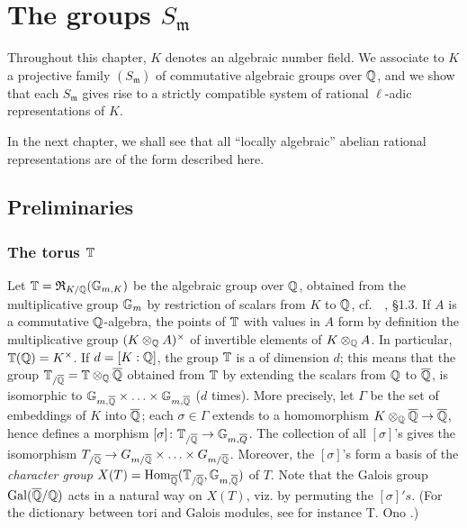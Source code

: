 \chapter{The groups \texorpdfstring{$S_{\mathfrak{m}}$}{Sm}}
\label{ch:ii}

Throughout this chapter,
\dpage
$K$ denotes an algebraic number field.
We associate to $K$ a projective family $(S_{\mathfrak{m}})$ of commutative
algebraic groups over $\mathbb{Q}$, and we show that each $S_{\mathfrak{m}}$ gives rise
to a strictly compatible system of rational $\ell$-adic representations of $K$.

In the next chapter, we shall see that all ``locally algebraic''
abelian rational representations are of the form described here.

\section{Preliminaries}
\label{sec:II_1}

\subsection{The torus $\mathbb{T}$}
\label{sec:II_11}
Let $\mathbb{T} = \operatorname{\mathfrak{R}}_{K/\mathbb{Q}}(\mathbb{G}_{m, K})$
be the algebraic group over $\mathbb{Q}$, obtained from the multiplicative group
$\mathbb{G}_m$ by restriction of scalars from $K$ to $\mathbb{Q}$, cf.\ 
\citeauthor{43}~\cite{43}, \S 1.3. If $A$ is a commutative $\mathbb{Q}$-algebra, the
points of $\mathbb{T}$ with values in $A$ form by definition the multiplicative group
$(K \otimes_{\mathbb{Q}} A)^\times$ of invertible elements of $K \otimes_{\mathbb{Q}} A$.
In particular, $\mathbb{T}(\mathbb{Q}) = K^\times$. If $d = [K : \mathbb{Q}]$, the group $\mathbb{T}$ is a
\strong{torus}\index{Torus} of dimension $d$; this means that the group
$\mathbb{T}_{/\overline{\mathbb{Q}}} = \mathbb{T} \otimes_{\mathbb{Q}} \overline{\mathbb{Q}}$ obtained from $\mathbb{T}$ by extending
the scalars from $\mathbb{Q}$ to $\overline{\mathbb{Q}}$, is isomorphic
\dpage
to $\mathbb{G}_{m, \overline{\mathbb{Q}}} \times \hdots \times \mathbb{G}_{m, \overline{\mathbb{Q}}}$ ($d$ times).
More precisely, let $\Gamma$ be the set of embeddings of $K$ into $\overline{\mathbb{Q}}$;
each $\sigma \in \Gamma$ extends to a homomorphism $K \otimes_{\mathbb{Q}} \overline{\mathbb{Q}}
\to \overline{\mathbb{Q}}$, hence defines a morphism $[\sigma]\colon \mathbb{T}_{/\overline{\mathbb{Q}}} \to
\mathbb{G}_{m, \overline{Q}}$. The collection of all $[\sigma]$'s gives the isomorphism
$T_{/ \overline{\mathbb{Q}}} \to G_{m/\overline{\mathbb{Q}}} \times \hdots \times G_{m/\overline{\mathbb{Q}}}$.
Moreover, the $[\sigma]$'s form a basis of the \emph{character group} $X(T) =
\operatorname{Hom}_{\overline{\mathbb{Q}}}(\mathbb{T}_{/\overline{\mathbb{Q}}}, \mathbb{G}_{m, \overline{\mathbb{Q}}})$ of $T$. Note that
the Galois group $\operatorname{Gal}(\overline{\mathbb{Q}} / \mathbb{Q})$ acts in a natural way on $X(T)$, viz.
by permuting the $[\sigma]'s$. (For the dictionary between tori and Galois
modules, see for instance T. Ono \cite{21}.)

